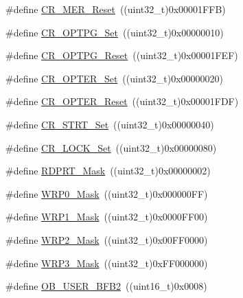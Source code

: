 \begin{DoxyCompactItemize}
\#define \mbox{\hyperlink{group___f_l_a_s_h___private___defines_gabed855f33ff965c530c2b09a49a987f5}{C\+R\+\_\+\+M\+E\+R\+\_\+\+Reset}}~((uint32\+\_\+t)0x00001\+F\+F\+B)
\item 
\#define \mbox{\hyperlink{group___f_l_a_s_h___private___defines_ga84ec77ffaa2a83edeef385e3a36171f8}{C\+R\+\_\+\+O\+P\+T\+P\+G\+\_\+\+Set}}~((uint32\+\_\+t)0x00000010)
\item 
\#define \mbox{\hyperlink{group___f_l_a_s_h___private___defines_ga9dd2ca46f4e8edfa098e1481699c08b7}{C\+R\+\_\+\+O\+P\+T\+P\+G\+\_\+\+Reset}}~((uint32\+\_\+t)0x00001\+F\+E\+F)
\item 
\#define \mbox{\hyperlink{group___f_l_a_s_h___private___defines_gac5707368555a5b7400eea1e306b62b16}{C\+R\+\_\+\+O\+P\+T\+E\+R\+\_\+\+Set}}~((uint32\+\_\+t)0x00000020)
\item 
\#define \mbox{\hyperlink{group___f_l_a_s_h___private___defines_ga0245cfe194895f1ad98ba66f8eda3e47}{C\+R\+\_\+\+O\+P\+T\+E\+R\+\_\+\+Reset}}~((uint32\+\_\+t)0x00001\+F\+D\+F)
\item 
\#define \mbox{\hyperlink{group___f_l_a_s_h___private___defines_ga0e6349818d8602ffffc56e5e04d9ab13}{C\+R\+\_\+\+S\+T\+R\+T\+\_\+\+Set}}~((uint32\+\_\+t)0x00000040)
\item 
\#define \mbox{\hyperlink{group___f_l_a_s_h___private___defines_gaee27a8100366266daa8d3a69c589e4b9}{C\+R\+\_\+\+L\+O\+C\+K\+\_\+\+Set}}~((uint32\+\_\+t)0x00000080)
\item 
\#define \mbox{\hyperlink{group___f_l_a_s_h___private___defines_gaa624b669116384b971b838ae201cad9f}{R\+D\+P\+R\+T\+\_\+\+Mask}}~((uint32\+\_\+t)0x00000002)
\item 
\#define \mbox{\hyperlink{group___f_l_a_s_h___private___defines_ga79707964cbd409601e1ddf6064cf1c5c}{W\+R\+P0\+\_\+\+Mask}}~((uint32\+\_\+t)0x000000\+F\+F)
\item 
\#define \mbox{\hyperlink{group___f_l_a_s_h___private___defines_gaa2b2535ba91736dd2d6baa92068686e0}{W\+R\+P1\+\_\+\+Mask}}~((uint32\+\_\+t)0x0000\+F\+F00)
\item 
\#define \mbox{\hyperlink{group___f_l_a_s_h___private___defines_ga4676f67c7be97a09eb1c6a5753ce0523}{W\+R\+P2\+\_\+\+Mask}}~((uint32\+\_\+t)0x00\+F\+F0000)
\item 
\#define \mbox{\hyperlink{group___f_l_a_s_h___private___defines_ga649ce8b78520ca192b41aabe2daef035}{W\+R\+P3\+\_\+\+Mask}}~((uint32\+\_\+t)0x\+F\+F000000)
\item 
\#define \mbox{\hyperlink{group___f_l_a_s_h___private___defines_ga5098bd938dadebbbdf9e628c84b2dcf0}{O\+B\+\_\+\+U\+S\+E\+R\+\_\+\+B\+F\+B2}}~((uint16\+\_\+t)0x0008)

\end{DoxyCompactItemize}
